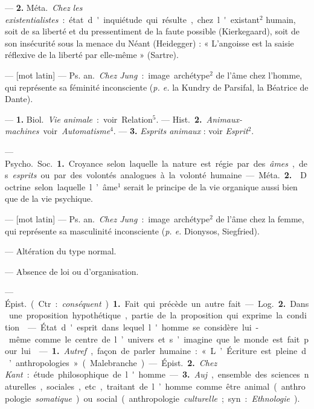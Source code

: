 \begin{itemize}[leftmargin=1cm, label=, itemsep=1pt]
{— {\bf 2.} \si{Méta.} {\it Chez les existentialistes} :
état d'inquiétude qui résulte, chez
l'existant$^2$ humain, soit de sa liberté
et du pressentiment de la faute possible (Kierkegaard), soit de son
insécurité sous la menace du Néant
(Heidegger) : « L'angoisse est la
saisie réflexive de la liberté par
elle-même » (Sartre).

 — [mot latin] — \si{Ps. an.} {\it Chez
Jung} : image archétype$^2$ de l’âme
chez l’homme, qui représente sa
féminité inconsciente ({\it p. e.} la Kundry
de Parsifal, la Béatrice de Dante).

 — {\bf 1.} \si{Biol.} {\it Vie animale} : voir
Relation$^5$. — \si{Hist.} {\bf 2.} {\it Animaux-machines} voir {\it Automatisme}$^4$. —
 {\bf 3.} {\it Esprits animaux} : voir {\it Esprit}$^2$.

 — \si{Psycho.} \si{Soc.} {\bf 1.} Croyance
selon laquelle la nature est régie par
des {\it âmes}, des {\it esprits} ou par des
volontés analogues à la volonté
humaine.

— \si{Méta.} {\bf 2.}  Doctrine selon laquelle l’âme$^1$ serait le principe de
la vie organique aussi bien que de
la vie psychique.

 — [mot latin] — \si{Ps. an.} {\it Chez
Jung} : image archétype$^2$ de l'âme
chez la femme, qui représente sa
masculinité inconsciente ({\it p. e.} Dionysos, Siegfried).

 — Altération du type
normal.

 — Absence de loi ou d’organisation.

 — \si{Épist.} (Ctr. : {\it conséquent}). {\bf 1.} Fait qui précède un autre
fait. — \si{Log.} {\bf 2.} Dans une proposition
hypothétique, partie de la proposition qui exprime la condition.

 — État d'esprit
dans lequel l'homme se considère
lui-même comme le centre de l’univers et s’imagine que le monde est
fait pour lui.

 — {\bf 1.} {\it Autref}., façon de
parler humaine : « L’Écriture est
pleine d’anthropologies » (Malebranche).

— \si{Épist.} {\bf 2.} {\it Chez Kant} : étude
philosophique de l'homme. — {\bf 3.}
{\it Auj}., ensemble des sciences naturelles, sociales, etc., traitant de
l’homme comme être animal (anthropologie {\it somatique})
ou social (anthropologie {\it culturelle}; syn. : {\it Ethnologie}).

}
\end{itemize}
